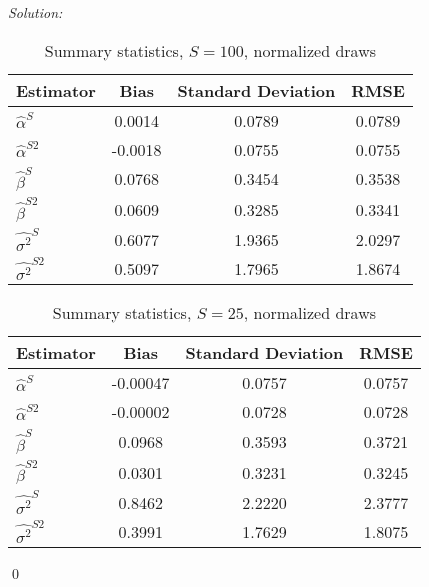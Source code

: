 \documentclass[12pt]{article}
\newenvironment{sol}
    {\emph{Solution:}
    }
    {
    \qed
    }
\begin{document}
\begin{sol}
          \begin{table}[htbp]
            \centering
            \caption{Summary statistics, $S = 100$, normalized draws}
              \begin{tabular}{lccc}
                  \toprule
                    Estimator                & Bias             & Standard Deviation         & RMSE           \\
                  \midrule
                    $\hat{\alpha}^S $  &  0.0014&  0.0789   &    0.0789\\
                    $\hat{\alpha}^{S2}$   &-0.0018 &  0.0755&    0.0755   \\
                    $\hat{\beta}^S $     &  0.0768  & 0.3454 &    0.3538  \\
                    $\hat{\beta}^{S2}$   & 0.0609 & 0.3285 &      0.3341  \\
                    $\hat{\sigma^2}^S $     &  0.6077  & 1.9365 &   2.0297  \\
                    $\hat{\sigma^2}^{S2}$   & 0.5097 &  1.7965 &    1.8674     \\
                  \bottomrule
              \end{tabular}
            \label{tab:cf10}
          \end{table}
   
          \begin{table}[htbp]
            \centering
            \caption{Summary statistics, $S = 25$, normalized draws}
              \begin{tabular}{lccc}
                  \toprule
                    Estimator                & Bias             & Standard Deviation         & RMSE           \\
                  \midrule
                  $\hat{\alpha}^S $  &  -0.00047  & 0.0757 & 0.0757 \\
                  $\hat{\alpha}^{S2}$   & -0.00002&  0.0728 &  0.0728  \\
                  $\hat{\beta}^S $     &  0.0968& 0.3593  &  0.3721 \\
                  $\hat{\beta}^{S2}$   & 0.0301 & 0.3231 &   0.3245  \\
                  $\hat{\sigma^2}^S $     &  0.8462  & 2.2220&   2.3777  \\
                  $\hat{\sigma^2}^{S2}$   & 0.3991 & 1.7629   & 1.8075  \\
                  \bottomrule
              \end{tabular}
            \label{tab:cf10}
          \end{table}
\end{sol}
\end{document}
